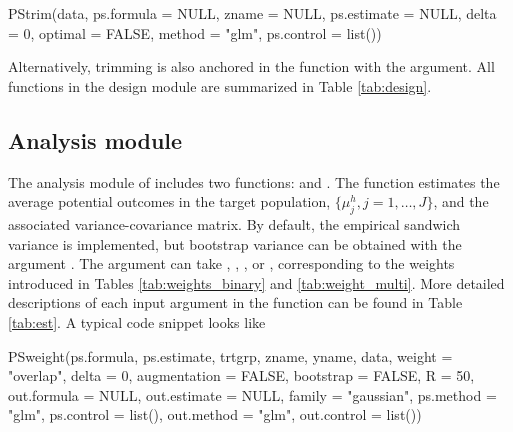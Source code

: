 \begin{example}
PStrim(data, ps.formula = NULL, zname = NULL, ps.estimate = NULL, delta = 0, 
    optimal = FALSE, method = "glm", ps.control = list())
\end{example}


Alternatively, trimming is also anchored in the  function with the  argument. All functions in the design module are summarized in Table \ref{tab:design}. 

\subsection{Analysis module}

The analysis module of  includes two functions:  and . The  function estimates the average potential outcomes in the target population, $\{\mu_{j}^{h},j=1,\ldots,J\}$, and the associated variance-covariance matrix. By default, the empirical sandwich variance is implemented, but bootstrap variance can be obtained with the argument . The  argument can take , , ,  or , corresponding to the weights introduced in Tables \ref{tab:weights_binary} and \ref{tab:weight_multi}. 
More detailed descriptions of each input argument in the  function can be found in Table \ref{tab:est}. A typical  code snippet looks like

\begin{example}
PSweight(ps.formula, ps.estimate, trtgrp, zname, yname, data, weight = "overlap", 
    delta = 0, augmentation = FALSE, bootstrap = FALSE, R = 50, out.formula = NULL,
    out.estimate = NULL, family = "gaussian", ps.method = "glm", ps.control = list(),
    out.method = "glm", out.control = list())
\end{example}
 
